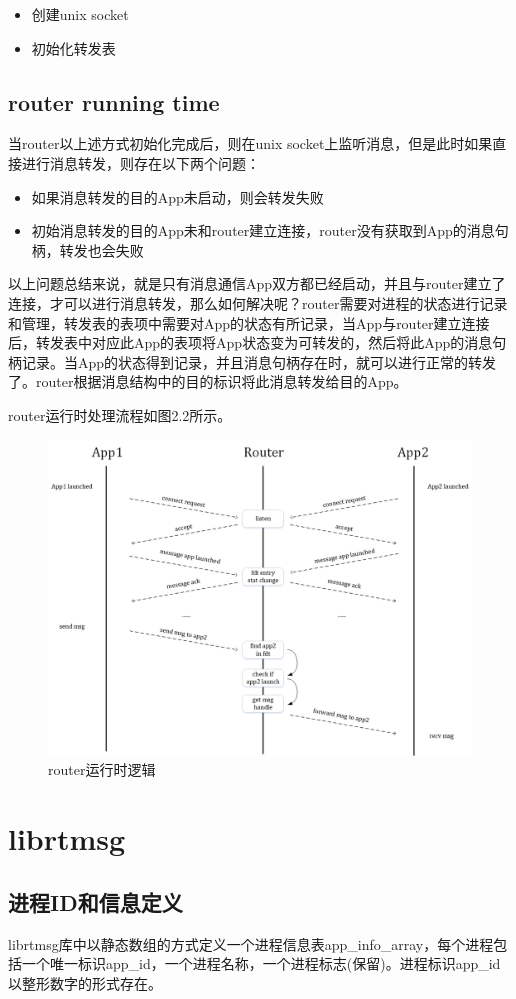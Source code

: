 \documentclass[a4paper,11pt,oneside]{ctexbook}
\begin{document}
\begin{itemize}
  \item{创建unix socket}
  \item{初始化转发表}
\end{itemize}

\section{router running time}
当router以上述方式初始化完成后，则在unix socket上监听消息，但是此时如果直接进行消息转发，则存在以下两个问题：

\begin{itemize}
  \item{如果消息转发的目的App未启动，则会转发失败}
  \item{初始消息转发的目的App未和router建立连接，router没有获取到App的消息句柄，转发也会失败}
\end{itemize}

以上问题总结来说，就是只有消息通信App双方都已经启动，并且与router建立了连接，才可以进行消息转发，那么如何解决呢？router需要对进程的状态进行记录和管理，转发表的表项中需要对App的状态有所记录，当App与router建立连接后，转发表中对应此App的表项将App状态变为可转发的，然后将此App的消息句柄记录。当App的状态得到记录，并且消息句柄存在时，就可以进行正常的转发了。router根据消息结构中的目的标识将此消息转发给目的App。

router运行时处理流程如图2.2所示。

\begin{figure}[ht]
    \centering
    \includegraphics[width=1\textwidth]{image/message-router-04.jpg}
    \caption{router运行时逻辑}
\end{figure}

\chapter{librtmsg}
\section{进程ID和信息定义}
librtmsg库中以静态数组的方式定义一个进程信息表app\_info\_array，每个进程包括一个唯一标识app\_id，一个进程名称，一个进程标志(保留)。进程标识app\_id以整形数字的形式存在。
\end{document}
